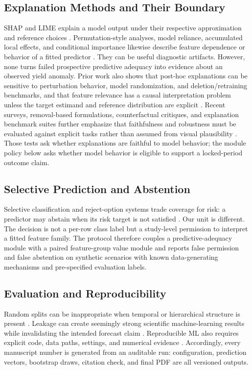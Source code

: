 \documentclass[conference]{IEEEtran}
\begin{document}
\subsection{Explanation Methods and Their Boundary}
SHAP and LIME explain a model output under their respective approximation and
reference choices \cite{LundbergLee2017,Ribeiro2016}. Permutation-style analyses,
model reliance, accumulated local effects, and conditional importance likewise
describe feature dependence or behavior of a fitted predictor
\cite{Fisher2019,ApleyZhu2020,Strobl2008}. They can be useful diagnostic artifacts.
However, none turns failed prospective predictive adequacy into evidence about an
observed yield anomaly. Prior work also shows that post-hoc explanations can be
sensitive to perturbation behavior, model randomization, and deletion/retraining
benchmarks, and that feature relevance has a causal interpretation problem unless
the target estimand and reference distribution are explicit
\cite{Adebayo2018,Hooker2019,Yeh2019,Slack2020,Janzing2020}. Recent surveys,
removal-based formulations, counterfactual critiques, and explanation benchmark
suites further emphasize that faithfulness and robustness must be evaluated
against explicit tasks rather than assumed from visual plausibility
\cite{Covert2021,Keane2021,Agarwal2022,Nauta2023,Hedstrom2023}. Those tests ask
whether explanations are faithful to model behavior; the module policy below asks
whether model behavior is eligible to support a locked-period outcome claim.

\subsection{Selective Prediction and Abstention}
Selective classification and reject-option systems trade coverage for risk:
a predictor may abstain when its risk target is not satisfied
\cite{ElYanivWiener2010,GeifmanElYaniv2017}. Our unit is different. The decision
is not a per-row class label but a study-level permission to interpret a fitted
feature family. The protocol therefore couples a predictive-adequacy module with a
paired feature-group value module and reports false permission and false abstention
on synthetic scenarios with known data-generating mechanisms and pre-specified
evaluation labels.

\subsection{Evaluation and Reproducibility}
Random splits can be inappropriate when temporal or hierarchical structure is
present \cite{Roberts2017}. Leakage can create seemingly strong scientific
machine-learning results while invalidating the intended forecast claim
\cite{KapoorNarayanan2023}. Reproducible ML also requires explicit code, data
paths, settings, and numerical evidence \cite{Pineau2021}. Accordingly, every
manuscript number is generated from an auditable run: configuration, prediction
vectors, bootstrap draws, citation check, and final PDF are all versioned outputs.
\end{document}
